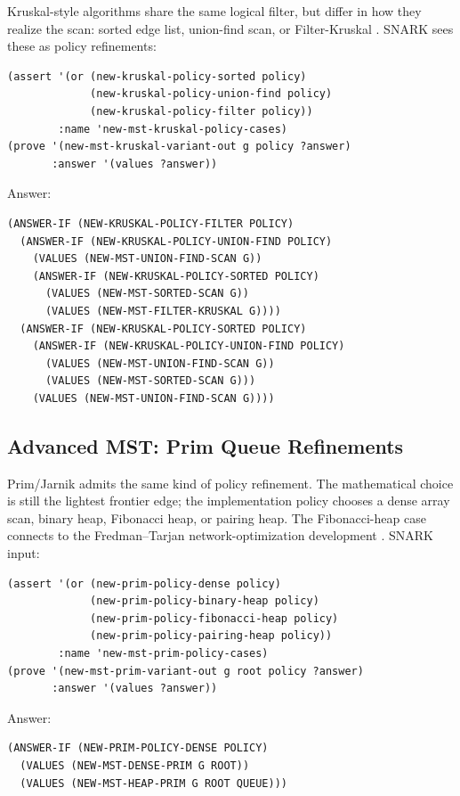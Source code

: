 \documentclass[runningheads]{llncs}
\begin{document}
Kruskal-style algorithms share the same logical filter, but differ in how they
realize the scan: sorted edge list, union-find scan, or Filter-Kruskal
\cite{Kruskal1956,CheritonTarjan1976,OsipovSandersSingler2009}.  SNARK sees
these as policy refinements:
\begin{lstlisting}
(assert '(or (new-kruskal-policy-sorted policy)
             (new-kruskal-policy-union-find policy)
             (new-kruskal-policy-filter policy))
        :name 'new-mst-kruskal-policy-cases)
(prove '(new-mst-kruskal-variant-out g policy ?answer)
       :answer '(values ?answer))
\end{lstlisting}
Answer:
\begin{lstlisting}
(ANSWER-IF (NEW-KRUSKAL-POLICY-FILTER POLICY)
  (ANSWER-IF (NEW-KRUSKAL-POLICY-UNION-FIND POLICY)
    (VALUES (NEW-MST-UNION-FIND-SCAN G))
    (ANSWER-IF (NEW-KRUSKAL-POLICY-SORTED POLICY)
      (VALUES (NEW-MST-SORTED-SCAN G))
      (VALUES (NEW-MST-FILTER-KRUSKAL G))))
  (ANSWER-IF (NEW-KRUSKAL-POLICY-SORTED POLICY)
    (ANSWER-IF (NEW-KRUSKAL-POLICY-UNION-FIND POLICY)
      (VALUES (NEW-MST-UNION-FIND-SCAN G))
      (VALUES (NEW-MST-SORTED-SCAN G)))
    (VALUES (NEW-MST-UNION-FIND-SCAN G))))
\end{lstlisting}

\subsection{Advanced MST: Prim Queue Refinements}

Prim/Jarnik admits the same kind of policy refinement.  The mathematical choice
is still the lightest frontier edge; the implementation policy chooses a dense
array scan, binary heap, Fibonacci heap, or pairing heap.  The Fibonacci-heap
case connects to the Fredman--Tarjan network-optimization development
\cite{FredmanTarjan1987}.
SNARK input:
\begin{lstlisting}
(assert '(or (new-prim-policy-dense policy)
             (new-prim-policy-binary-heap policy)
             (new-prim-policy-fibonacci-heap policy)
             (new-prim-policy-pairing-heap policy))
        :name 'new-mst-prim-policy-cases)
(prove '(new-mst-prim-variant-out g root policy ?answer)
       :answer '(values ?answer))
\end{lstlisting}
Answer:
\begin{lstlisting}
(ANSWER-IF (NEW-PRIM-POLICY-DENSE POLICY)
  (VALUES (NEW-MST-DENSE-PRIM G ROOT))
  (VALUES (NEW-MST-HEAP-PRIM G ROOT QUEUE)))
\end{lstlisting}
\end{document}
